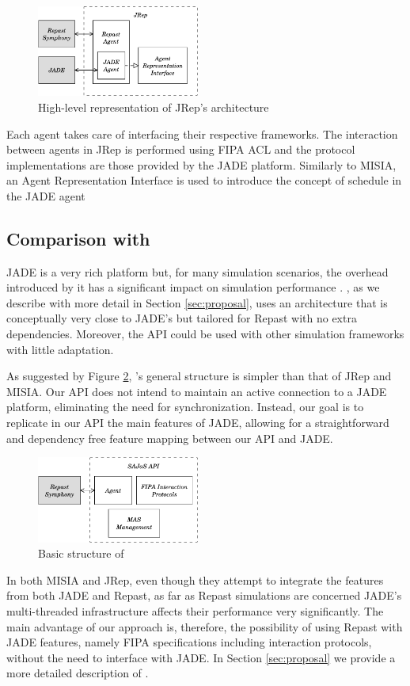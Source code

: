 \begin{figure}
	\centering
	\includegraphics[width=2.1in]{figures/jrep.pdf}
	\caption{High-level representation of JRep's architecture}
	\label{fig:jrep}
\end{figure}

Each agent takes care of interfacing their respective frameworks. The interaction between agents in JRep is performed using FIPA ACL and the protocol implementations are those provided by the JADE platform. Similarly to MISIA, an Agent Representation Interface is used to introduce the concept of schedule in the JADE agent


\subsection{Comparison with \apiname{}}

JADE is a very rich platform but, for many simulation scenarios, the overhead introduced by it has a significant impact on simulation performance \cite{mengistu2008scalability}. \apiname{}, as we describe with more detail in Section \ref{sec:proposal}, uses an architecture that is conceptually very close to JADE's but tailored for Repast with no extra dependencies. Moreover, the API could be used with other simulation frameworks with little adaptation.

As suggested by Figure \ref{fig:related-repacl}, \apiname{}'s general structure is simpler than that of JRep and MISIA. Our API does not intend to maintain an active connection to a JADE platform, eliminating the need for synchronization. Instead, our goal is to replicate in our API the main features of JADE, allowing for a straightforward and dependency free feature mapping between our API and JADE.

\begin{figure}
	\centering
	\includegraphics[width=2.1in]{figures/repacl.pdf}
	\caption{Basic structure of \apiname{}}
	\label{fig:related-repacl}
\end{figure}

In both MISIA and JRep, even though they attempt to integrate the features from both JADE and Repast, as far as Repast simulations are concerned JADE's multi-threaded infrastructure affects their performance very significantly. The main advantage of our approach is, therefore, the possibility of using Repast with JADE features, namely FIPA specifications including interaction protocols, without the need to interface with JADE. In Section \ref{sec:proposal} we provide a more detailed description of \apiname{}.

